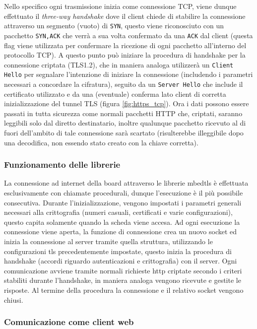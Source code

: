 Nello specifico ogni trasmissione inizia come connessione TCP, viene dunque effettuato il \textit{three-way handshake} dove il client chiede di stabilire la connessione attraverso un segmento (vuoto) di \texttt{SYN}, questo viene riconosciuto con un pacchetto \texttt{SYN,ACK} che verr\`a a sua volta confermato da una \texttt{ACK} dal client (questa flag viene utilizzata per confermare la ricezione di ogni pacchetto all'interno del protocollo TCP). A questo punto pu\`o iniziare la procedura di handshake per la connessione criptata (TLS1.2), che in maniera analoga utilizzer\`a un \texttt{Client Hello} per segnalare l'intenzione di iniziare la connessione (includendo i parametri necessari a concordare la cifratura), seguito da un \texttt{Server Hello} che include il certificato utilizzato e da una (eventuale) conferma lato client di corretta inizializzazione del tunnel TLS (figura \ref{fig:https_tcp}). Ora i dati possono essere passati in tutta sicurezza come normali pacchetti HTTP che, criptati, saranno leggibili solo dal diretto destinatario, inoltre qualunque pacchetto ricevuto al di fuori dell'ambito di tale connessione sar\`a scartato (risulterebbe illeggibile dopo una decodifica, non essendo stato creato con la chiave corretta).

\subsubsection{Funzionamento delle librerie}

La connessione ad internet della board attraverso le librerie mbedtls \`e effettuata esclusivamente con chiamate procedurali, dunque l'esecuzione \`e il pi\`u possibile consecutiva. Durante l'inizializzazione, vengono impostati i parametri generali necessari alla crittografia (numeri casuali, certificati e varie configurazioni), questo capita solamente quando la scheda viene accesa. Ad ogni esecuzione la connessione viene aperta, la funzione di connessione crea un nuovo socket ed inizia la connessione al server tramite quella struttura, utilizzando le configurazioni tls precedentemente impostate, questo inizia la procedura di handshake (accordi riguardo autenticazioni e crittografia) con il server. Ogni comunicazione avviene tramite normali richieste http criptate secondo i criteri stabiliti durante l'handshake, in maniera analoga vengono ricevute e gestite le risposte. Al termine della procedura la connessione e il relativo socket vengono chiusi.

\subsubsection{Comunicazione come client web}

